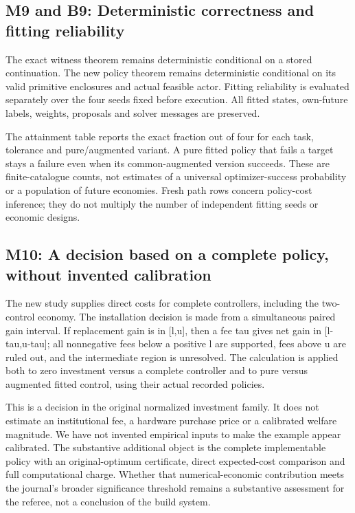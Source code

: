 \documentclass[ecta,nameyear,draft]{econsocart}
\begin{document}
\hypertarget{m9-and-b9-deterministic-correctness-and-fitting-reliability}{%
\subsection{M9 and B9: Deterministic correctness and fitting
reliability}\label{m9-and-b9-deterministic-correctness-and-fitting-reliability}}

The exact witness theorem remains deterministic conditional on a stored
continuation. The new policy theorem remains deterministic conditional
on its valid primitive enclosures and actual feasible actor. Fitting
reliability is evaluated separately over the four seeds fixed before
execution. All fitted states, own-future labels, weights, proposals and
solver messages are preserved.

The attainment table reports the exact fraction out of four for each
task, tolerance and pure/augmented variant. A pure fitted policy that
fails a target stays a failure even when its common-augmented version
succeeds. These are finite-catalogue counts, not estimates of a
universal optimizer-success probability or a population of future
economies. Fresh path rows concern policy-cost inference; they do not
multiply the number of independent fitting seeds or economic designs.

\hypertarget{m10-a-decision-based-on-a-complete-policy-without-invented-calibration}{%
\subsection{M10: A decision based on a complete policy, without invented
calibration}\label{m10-a-decision-based-on-a-complete-policy-without-invented-calibration}}

The new study supplies direct costs for complete controllers, including
the two-control economy. The installation decision is made from a
simultaneous paired gain interval. If replacement gain is in {[}l,u{]},
then a fee tau gives net gain in {[}l-tau,u-tau{]}; all nonnegative fees
below a positive l are supported, fees above u are ruled out, and the
intermediate region is unresolved. The calculation is applied both to
zero investment versus a complete controller and to pure versus
augmented fitted control, using their actual recorded policies.

This is a decision in the original normalized investment family. It does
not estimate an institutional fee, a hardware purchase price or a
calibrated welfare magnitude. We have not invented empirical inputs to
make the example appear calibrated. The substantive additional object is
the complete implementable policy with an original-optimum certificate,
direct expected-cost comparison and full computational charge. Whether
that numerical-economic contribution meets the journal's broader
significance threshold remains a substantive assessment for the referee,
not a conclusion of the build system.
\end{document}
